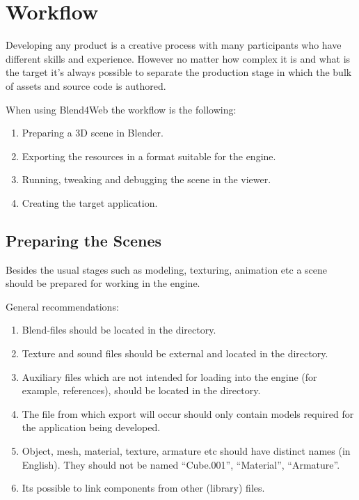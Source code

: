 \documentclass[a4paper,12pt,oneside]{sphinxmanual}
\begin{document}
\chapter{Workflow}
\label{workflow::doc}\label{workflow:working-process-stages}\label{workflow:id1}
Developing any product is a creative process with many participants who have different skills and experience. However no matter how complex it is and what is the target it's always possible to separate the production stage in which the bulk of assets and source code is authored.

When using Blend4Web the workflow is the following:
\begin{enumerate}
\item {} 
Preparing a 3D scene in Blender.

\item {} 
Exporting the resources in a format suitable for the engine.

\item {} 
Running, tweaking and debugging the scene in the viewer.

\item {} 
Creating the target application.

\end{enumerate}


\section{Preparing the Scenes}
\label{workflow:id2}
Besides the usual stages such as modeling, texturing, animation etc a scene should be prepared for working in the engine.

General recommendations:
\begin{enumerate}
\item {} 
Blend-files should be located in the  directory.

\item {} 
Texture and sound files should be external and located in the  directory.

\item {} 
Auxiliary files which are not intended for loading into the engine (for example, references), should be located in the  directory.

\item {} 
The file from which export will occur should only contain models required for the application being developed.

\item {} 
Object, mesh, material, texture, armature etc should have distinct names (in English). They should not be named ``Cube.001'', ``Material'', ``Armature''.

\item {} 
Its possible to link components from other (library) files.

\end{enumerate}
\end{document}
